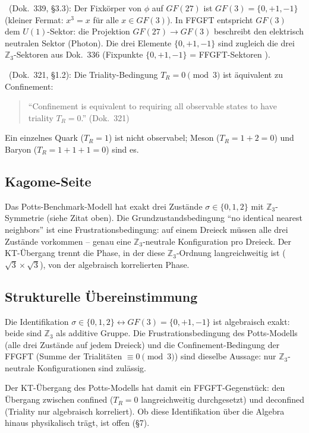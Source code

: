 \BM\ (Dok.~339, §3.3): Der Fixkörper von $\phi$ auf $GF(27)$ ist
$GF(3)=\{0,+1,-1\}$ (kleiner Fermat: $x^3=x$ für alle $x\in GF(3)$). In
FFGFT entspricht $GF(3)$ dem $U(1)$-Sektor: die Projektion $GF(27)\to GF(3)$
beschreibt den elektrisch neutralen Sektor (Photon). Die drei Elemente
$\{0,+1,-1\}$ sind zugleich die drei $\mathbb{Z}_3$-Sektoren aus Dok.~336
(Fixpunkte $\{0,+1,-1\}$ = FFGFT-Sektoren \BM).

\BM\ (Dok.~321, §1.2): Die Triality-Bedingung $T_R=0\pmod{3}$ ist
äquivalent zu Confinement:
\begin{quote}
\enquote{Confinement is equivalent to requiring all observable states to have
triality $T_R=0$.} (Dok.~321)
\end{quote}
Ein einzelnes Quark ($T_R=1$) ist nicht observabel; Meson ($T_R=1+2=0$) und
Baryon ($T_R=1+1+1=0$) sind es.

\subsection{Kagome-Seite}

Das Potts-Benchmark-Modell hat exakt drei Zustände $\sigma\in\{0,1,2\}$ mit
$\mathbb{Z}_3$-Symmetrie (siehe Zitat oben). Die Grundzustandsbedingung
\enquote{no identical nearest neighbors} ist eine Frustrationsbedingung: auf
einem Dreieck müssen alle drei Zustände vorkommen -- genau eine
$\mathbb{Z}_3$-neutrale Konfiguration pro Dreieck. Der KT-Übergang trennt die
Phase, in der diese $\mathbb{Z}_3$-Ordnung langreichweitig ist
($\sqrt{3}\times\sqrt{3}$), von der algebraisch korrelierten Phase.

\subsection{Strukturelle Übereinstimmung}

Die Identifikation $\sigma\in\{0,1,2\}\leftrightarrow GF(3)=\{0,+1,-1\}$ ist
algebraisch exakt: beide sind $\mathbb{Z}_3$ als additive Gruppe. Die
Frustrationsbedingung des Potts-Modells (alle drei Zustände auf jedem
Dreieck) und die Confinement-Bedingung der FFGFT (Summe der Trialitäten
$\equiv0\pmod{3}$) sind dieselbe Aussage: nur $\mathbb{Z}_3$-neutrale
Konfigurationen sind zulässig. \SM

Der KT-Übergang des Potts-Modells hat damit ein FFGFT-Gegenstück: den
Übergang zwischen confined ($T_R=0$ langreichweitig durchgesetzt) und
deconfined (Triality nur algebraisch korreliert). Ob diese Identifikation
über die Algebra hinaus physikalisch trägt, ist offen (§7).

